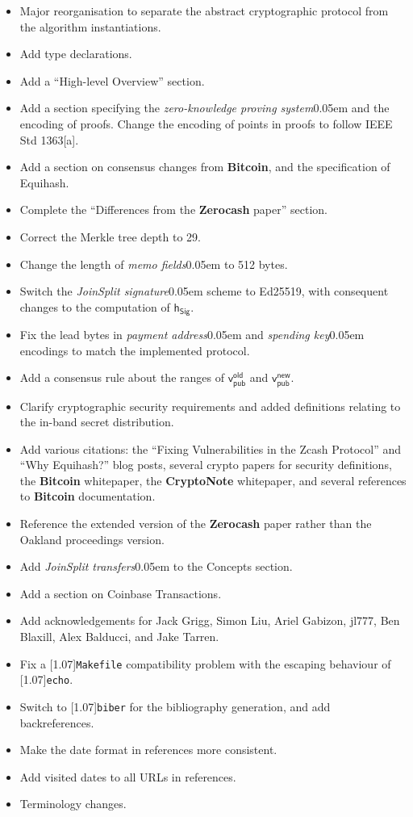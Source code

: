 \documentclass{article}
\let\oldtexttt\texttt
\renewcommand{\texttt}[1]{\scalebox{1.02}[1.07]{\oldtexttt{#1}}}
\newcommand{\term}[1]{\textsl{#1}\kern 0.05em\xspace}
\newcommand{\termbf}[1]{\textbf{#1}\xspace}
\newcommand{\Zerocash}{\termbf{Zerocash}}
\newcommand{\Bitcoin}{\termbf{Bitcoin}}
\newcommand{\CryptoNote}{\termbf{CryptoNote}}
\newcommand{\joinSplitTransfers}{\term{JoinSplit transfers}}
\newcommand{\joinSplitSignature}{\term{JoinSplit signature}}
\newcommand{\zeroKnowledgeProvingSystem}{\term{zero-knowledge proving system}}
\newcommand{\paymentAddress}{\term{payment address}}
\newcommand{\spendingKey}{\term{spending key}}
\newcommand{\memos}{\term{memo fields}}
\newcommand{\hSig}{\mathsf{h_{Sig}}}
\newcommand{\vpubOld}{\mathsf{v_{pub}^{old}}}
\newcommand{\vpubNew}{\mathsf{v_{pub}^{new}}}
\begin{document}
\begin{itemize}
    \item Major reorganisation to separate the abstract cryptographic protocol
          from the algorithm instantiations.
    \item Add type declarations.
    \item Add a ``High-level Overview'' section.
    \item Add a section specifying the \zeroKnowledgeProvingSystem and the
          encoding of proofs. Change the encoding of points in proofs to follow
          IEEE Std 1363[a].
    \item Add a section on consensus changes from \Bitcoin, and the specification
          of Equihash.
    \item Complete the ``Differences from the \Zerocash paper'' section.
    \item Correct the Merkle tree depth to 29.
    \item Change the length of \memos to 512 bytes.
    \item Switch the \joinSplitSignature scheme to Ed25519, with consequent
          changes to the computation of $\hSig$.
    \item Fix the lead bytes in \paymentAddress and \spendingKey encodings to
          match the implemented protocol.
    \item Add a consensus rule about the ranges of $\vpubOld$ and $\vpubNew$.
    \item Clarify cryptographic security requirements and added definitions
          relating to the in-band secret distribution.
    \item Add various citations: the ``Fixing Vulnerabilities in the Zcash
          Protocol'' and ``Why Equihash?'' blog posts, several crypto papers
          for security definitions, the \Bitcoin whitepaper, the \CryptoNote
          whitepaper, and several references to \Bitcoin documentation.
    \item Reference the extended version of the \Zerocash paper rather than the
          Oakland proceedings version.
    \item Add \joinSplitTransfers to the Concepts section.
    \item Add a section on Coinbase Transactions.
    \item Add acknowledgements for Jack Grigg, Simon Liu, Ariel Gabizon, jl777,
          Ben Blaxill, Alex Balducci, and Jake Tarren.
    \item Fix a \texttt{Makefile} compatibility problem with the escaping behaviour
          of \texttt{echo}.
    \item Switch to \texttt{biber} for the bibliography generation, and add
          backreferences.
    \item Make the date format in references more consistent.
    \item Add visited dates to all URLs in references.
    \item Terminology changes.
\end{itemize}
\end{document}
